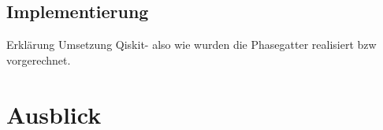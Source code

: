 \documentclass[
	a4paper, %
	10pt, %
	unnumberedsections, %
	twoside, %
]{LTJournalArticle}
\begin{document}
\subsection{\normalsize Implementierung}
Erklärung Umsetzung Qiskit- also wie wurden die Phasegatter realisiert bzw vorgerechnet. 




\section{Ausblick}



\printbibliography %

\end{document}
